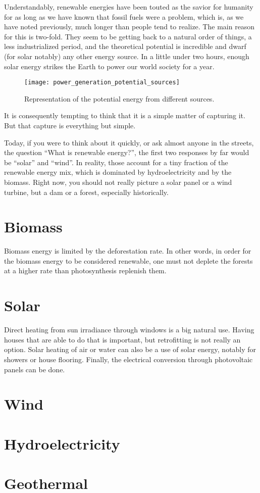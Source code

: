 Understandably, renewable energies have been touted as the savior for humanity for as long as we have known that fossil fuels were a problem, which is, as we have noted previously, much longer than people tend to realize. The main reason for this is two-fold. They seem to be getting back to a natural order of things, a less industrialized period, and the theoretical potential is incredible and dwarf (for solar notably) any other energy source. In a little under two hours, enough solar energy strikes the Earth to power our world society for a year.

\begin{figure}[hb]
	\texttt{[image: power\_generation\_potential\_sources]}
	\caption[Representation of the potential energy from different sources]{Representation of the potential energy from different sources.}
\end{figure}

It is consequently tempting to think that it is a simple matter of capturing it. But that capture is everything but simple.

Today, if you were to think about it quickly, or ask almost anyone in the streets, the question “What is renewable energy?”, the first two responses by far would be “solar” and “wind”. In reality, those account for a tiny fraction of the renewable energy mix, which is dominated by hydroelectricity and by the biomass. Right now, you should not really picture a solar panel or a wind turbine, but a dam or a forest, especially historically.

\section{Biomass}

Biomass energy is limited by the deforestation rate. In other words, in order for the biomass energy to be considered renewable, one must not deplete the forests at a higher rate than photosynthesis replenish them.

\section{Solar}

Direct heating from sun irradiance through windows is a big natural use. Having houses that are able to do that is important, but retrofitting is not really an option. Solar heating of air or water can also be a use of solar energy, notably for showers or house flooring. Finally, the electrical conversion through photovoltaic panels can be done.


\section{Wind}

\blindtext

\section{Hydroelectricity}

\blindtext

\section{Geothermal}

\blindtext